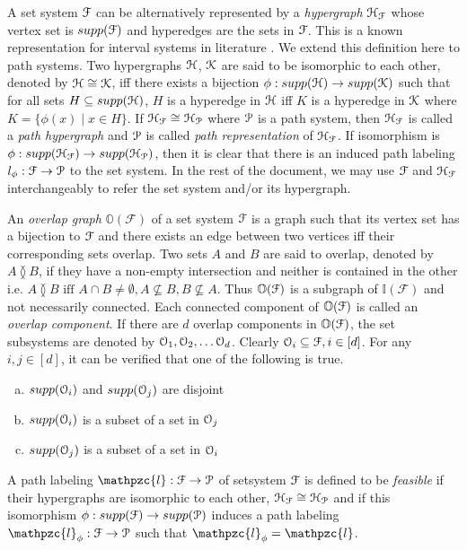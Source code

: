 \documentclass[a4paper,UKenglish,numberwithinsect]{lipics} %
\def\cF{{\cal F}}
\def\cH{{\cal H}}
\def\cK{{\cal K}}
\def\cO{{\cal O}}
\def\cP{{\cal P}}
\def\F{{\mathcal F}}
\def\H{{\mathcal H}}
\def\bI{\mathbb I}
\def\bO{\mathbb O}
\def\cl{\mathpzc{l}}
\def\overlap{\between}
\begin{document}
\noindent
A set system $\cF$ can be alternatively represented by a {\em
  hypergraph} $\H_\cF$ whose vertex set is $supp(\cF)$ and hyperedges
are the sets in $\cF$. This is a known representation for interval
systems in literature \cite{bls99}.  We extend this definition here to
path systems.  Two hypergraphs $\cH$, $\cK$ are said to be isomorphic
to each other, denoted by $\cH \cong \cK$, iff there exists a
bijection $\phi: supp(\cH) \rightarrow supp(\cK)$ such that for all
sets $H \subseteq supp(\cH)$, $H$ is a hyperedge in $\cH$ iff $K$ is a
hyperedge in $\cK$ where $K = \{\phi(x) \mid x \in H\}$.  If $\H_\cF
\cong \H_\cP$ where $\cP$ is a path system, then $\H_\cF$ is
called a {\em path hypergraph}
and $\cP$ is called {\em path representation} of $\H_\cF$. If
isomorphism is $\phi: supp(\H_\cF) \rightarrow supp(\H_\cP)$, then it
is clear that there is an induced path labeling $l_\phi: \cF
\rightarrow \cP$ to the
set system. In the rest of the document, we may use $\cF$ and
$\cH_\cF$ interchangeably to refer the set system and/or its hypergraph.

\noindent
An {\em overlap graph} $\bO(\F)$ of a set system $\cF$ is a graph such
that its vertex set has a bijection to $\cF$ and there exists an edge
between two vertices iff their corresponding sets overlap. Two sets
$A$ and $B$ are said to overlap, denoted by $A \overlap B$, if they
have a non-empty intersection and neither is contained in the other
i.e. $A \overlap B \text{ iff } A \cap B \ne \emptyset, A \nsubseteq B, B
\nsubseteq A$. Thus $\bO(\cF)$ is a subgraph of $\bI(\F)$ and not
necessarily connected. Each connected component of $\bO(\cF)$ is
called an {\em overlap component}. If there are $d$ overlap components
in $\bO(\cF)$, the set subsystems are denoted by $\cO_1, \cO_2, \ldots
\cO_d$. Clearly $\cO_i \subseteq \F, i \in [d]$. For any $i, j \in [d]$,
it can be verified that one of the following is true.
\begin{enumerate}[a) ]
\item $supp(\cO_i)$ and $supp(\cO_j)$ are disjoint
\item $supp(\cO_i)$ is a subset of a set in $\cO_j$
\item $supp(\cO_j)$ is a subset of a set in $\cO_i$
\end{enumerate}
 
\noindent
A path labeling $\cl: \cF \rightarrow \cP$ of setsystem $\cF$ is defined to be {\em
  feasible} if their hypergraphs are isomorphic to each other,
$\cH_\cF \cong \cH_\cP$ and if this isomorphism $\phi: supp(\cF)
\rightarrow supp(\cP)$ induces a path labeling $\cl_\phi: \cF
\rightarrow \cP$ such that $\cl_\phi = \cl$. 
\end{document}
